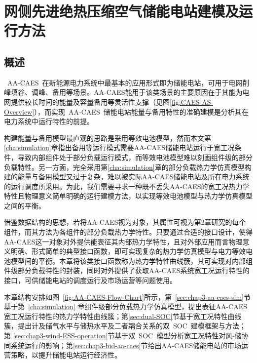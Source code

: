 \chapter{网侧先进绝热压缩空气储能电站建模及运行方法}
\label{cha:aa-caes}

\section{概述}
\label{sec:aa-caes-intro}
~AA-CAES~在新能源电力系统中最基本的应用形式即为储能电站，可用于电网削峰填谷、调峰、备用等场景。AA-CAES能用于该类场景的主要原因在于其能为电网提供较长时间的能量及容量备用等灵活性支撑（见图\ref{fig:CAES-AS-Overview}），而实现~AA-CAES~储能电站能量与备用特性的准确建模是分析其在电力系统中运行特性的前提。

构建能量与备用模型最直观的思路是采用等效电池模型，然而本文第\ref{cha:simulation}章指出备用等运行模式需要AA-CAES储能电站运行于宽工况条件，导致内部组件处于部分负载运行模式，而等效电池模型难以刻画组件级的部分负载特性。另一方面，完全采用第\ref{cha:simulation}章的部分负载热力学仿真模型构建的能量与备用模型又过于复杂，难以被实际AA-CAES储能电站及所在电力系统的运行调度所采用。为此，我们需要寻求一种既不丢失AA-CAES的宽工况热力学特性且物理意义简单明确的运行建模方法，以实现等效电池模型与热力学仿真模型之间的平衡。

借鉴数据结构的思想，若将AA-CAES视为对象，其属性可视为第2章研究的每个组件，而其方法为各组件的部分负载热力学特性。只要通过合适的接口设计，使得AA-CAES这一对象对外提供能表征其内部热力学特性，且对外部应用而言物理意义明确、形式简单的典型接口函数，即可实现复杂的热力学仿真模型与电力等效电池模型间的平衡。本章将该类接口函数称为热力学特性曲线簇，其可实现对内部组件级部分负载特性的封装，同时对外提供了获取AA-CAES系统宽工况运行特性的接口，可供储能电站的调度运行及市场运营等问题使用。

本章结构安排如图~\ref{fig:AA-CAES-Flow-Chart}所示，第~\ref{sec:chap3-aa-caes-sim}节基于第~\ref{cha:simulation} 章组件级部分负载热力学仿真模型，提出表征AA-CAES宽工况运行特性的热力学特性曲线簇；第\ref{sec:dual-SOC}节基于宽工况特性曲线簇，提出计及储气水平与储热水平及二者耦合关系的双~SOC~建模框架与方法；第
\ref{sec:chap3-wind-ESS-operation}节基于双~SOC~模型分析宽工况特性对风-储协同系统运行的影响；第\ref{sec:chap3-bid-aa-caes}节给出AA-CAES储能电站的市场运营策略，以提升储能电站运行经济性。


